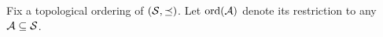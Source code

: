 \begingroup
\LinesNumbered
\begin{algorithm}[h]
\DontPrintSemicolon
\caption{A greedy algorithm for $\ProblemPCMSSC$ with inforest precedence constraints.}
\label{alg:inforest-fPCMSSC}
Fix a topological ordering of $(\mathcal{S},\preceq)$. Let $\operatorname{ord}(\mathcal{A})$ denote its restriction to any $\mathcal{A}\subseteq\mathcal{S}$.\;
\end{algorithm}
\endgroup
